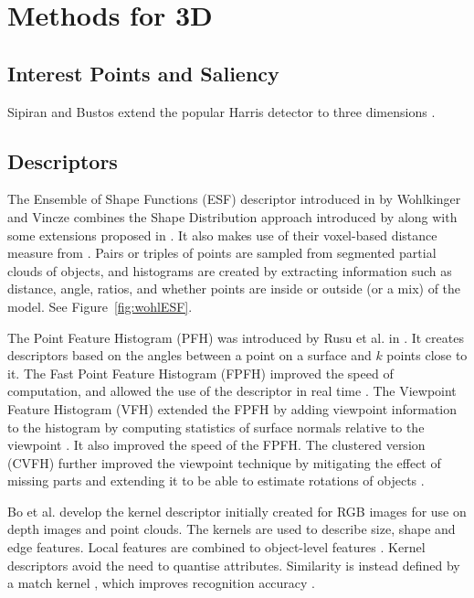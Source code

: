 \documentclass[10pt,a4paper]{article}
\begin{document}
\section{Methods for 3D}
\subsection{Interest Points and Saliency}
Sipiran and Bustos extend the popular Harris detector \cite{harris1988combined}
to three dimensions \cite{sipiran2011harris}.

\subsection{Descriptors}
The Ensemble of Shape Functions (ESF) descriptor introduced in
\cite{wohlkinger2011ensemble} by Wohlkinger and Vincze combines the Shape
Distribution approach introduced by \cite{osada2002shape} along with some
extensions proposed in \cite{ip2002using}. It also makes use of their
voxel-based distance measure from \cite{wohlkinger2011shapedist}. Pairs or triples of
points are sampled from segmented partial clouds of objects, and histograms are
created by extracting information such as distance, angle, ratios, and whether
points are inside or outside (or a mix) of the model. See
Figure~\ref{fig:wohlESF}.

The Point Feature Histogram (PFH) was introduced by Rusu et al. in
\cite{rusu2008persistent}. It creates descriptors based on the angles between a
point on a surface and $k$ points close to it. The Fast Point Feature Histogram
(FPFH) improved the speed of computation, and allowed the use of the descriptor
in real time \cite{rusu2009fast}. The Viewpoint Feature Histogram (VFH) extended
the FPFH by adding viewpoint information to the histogram by computing
statistics of surface normals relative to the viewpoint \cite{rusu2010fast}. It
also improved the speed of the FPFH. The clustered version (CVFH) further
improved the viewpoint technique by mitigating the effect of missing
parts and extending it to be able to estimate rotations of objects
\cite{aldoma2011cad}.

Bo et al. develop the kernel descriptor initially created for RGB images for use
on depth images and point clouds. The kernels are used to describe size, shape
and edge features. Local features are combined to object-level features . Kernel
descriptors avoid the need to quantise attributes. Similarity is instead defined
by a match kernel \cite{bo2010kernel}, which improves recognition accuracy
\cite{bo2011depth}.
\end{document}
